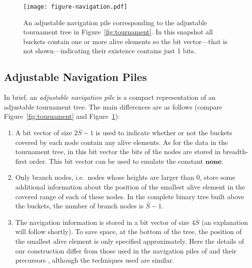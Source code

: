\documentclass[final,onetabnum,onefignum,onethmnum]{siamltex}
\begin{document}
\begin{figure}[tb!]
\begin{center}
\centerline{\texttt{[image: figure-navigation.pdf]}}
\end{center}

\vspace*{-0.5cm}
\caption{An adjustable navigation pile corresponding to the adjustable
  tournament tree in \mbox{Figure}~\ref{fig:tournament}. In this snapshot all
  buckets contain one or more alive elements so the bit vector---that
  is not shown---indicating their existence contains just 1 bits.}
\label{fig:pile}
\end{figure}

\subsection{Adjustable Navigation Piles} 
In brief, an \emph{adjustable navigation pile} is a compact
representation of an adjustable tournament tree.  The main differences
are as follows (compare Figure~\ref{fig:tournament} and
Figure~\ref{fig:pile}):
\begin{enumerate}
\item A bit vector of size $2\bar{S} -1$ is used to indicate
  whether or not the buckets covered by each node contain any alive
  elements. As for the data in the tournament tree, in this bit vector the
  bits of the nodes are stored in breadth-first order. This bit vector
  can be used to emulate the constant $\mathbf{none}$.
\item Only branch nodes, i.e.~nodes whose heights are larger than
  0, store some additional information about the position of the
  smallest alive element in the covered range of each of these nodes. In the
  complete binary tree built above the buckets, the number of branch nodes
  is $\bar{S} - 1$.
\item The navigation information is stored in a bit vector of
  size $4\bar{S}$ (an explanation will follow shortly).  To save space,
  at the bottom of the tree, the position of the smallest alive
  element is only specified approximately. Here the details of our
  construction differ from those used in the navigation piles of
  \cite{KV03} and their precursors \cite{PR98}, although the
  techniques used are similar.
\end{enumerate}
\end{document}
